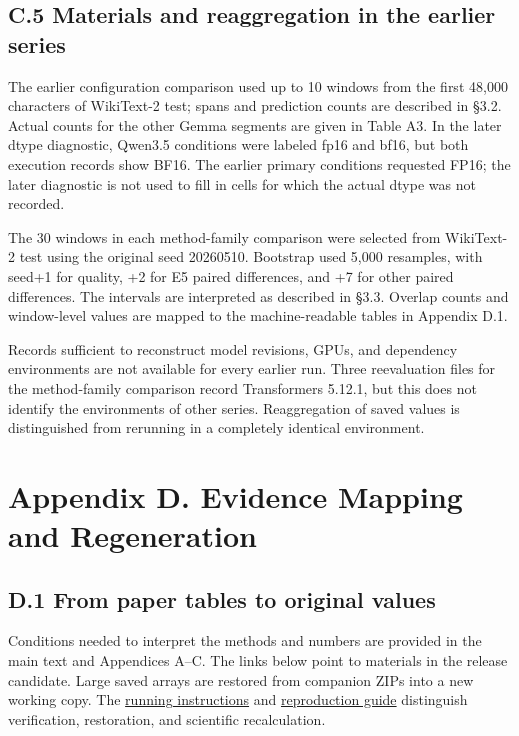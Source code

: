 \documentclass[10pt,a4paper]{article}
\begin{document}
\subsection{C.5 Materials and reaggregation in the earlier series}\label{c.5-materials-and-reaggregation-in-the-earlier-series}

The earlier configuration comparison used up to 10 windows from the first 48,000 characters of WikiText-2 test; spans and prediction counts are described in §3.2. Actual counts for the other Gemma segments are given in Table A3. In the later dtype diagnostic, Qwen3.5 conditions were labeled fp16 and bf16, but both execution records show BF16. The earlier primary conditions requested FP16; the later diagnostic is not used to fill in cells for which the actual dtype was not recorded.

The 30 windows in each method-family comparison were selected from WikiText-2 test using the original seed 20260510. Bootstrap used 5,000 resamples, with seed+1 for quality, +2 for E5 paired differences, and +7 for other paired differences. The intervals are interpreted as described in §3.3. Overlap counts and window-level values are mapped to the machine-readable tables in Appendix D.1.

Records sufficient to reconstruct model revisions, GPUs, and dependency environments are not available for every earlier run. Three reevaluation files for the method-family comparison record Transformers 5.12.1, but this does not identify the environments of other series. Reaggregation of saved values is distinguished from rerunning in a completely identical environment.

\section{Appendix D. Evidence Mapping and Regeneration}\label{appendix-d.-evidence-mapping-and-regeneration}

\subsection{D.1 From paper tables to original values}\label{d.1-from-paper-tables-to-original-values}

Conditions needed to interpret the methods and numbers are provided in the main text and Appendices A--C. The links below point to materials in the release candidate. Large saved arrays are restored from companion ZIPs into a new working copy. The \href{https://github.com/metaSATOKEN/nsn/blob/c37d39ea0106274d9f661cfbb268b0ed05319846/RUNNING.md}{running instructions} and \href{https://github.com/metaSATOKEN/nsn/blob/c37d39ea0106274d9f661cfbb268b0ed05319846/REPRODUCIBILITY.md}{reproduction guide} distinguish verification, restoration, and scientific recalculation.
\end{document}
